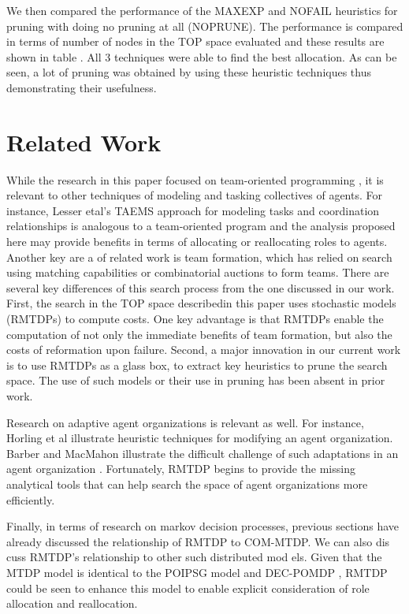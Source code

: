 \documentclass{IEEEtran}
\begin{document}
 We then compared the performance of the MAXEXP and
 NOFAIL heuristics for pruning with doing no pruning at
 all (NOPRUNE). The performance is compared in terms of
 number of nodes in the TOP space evaluated and these results are shown in table . All 3 techniques were able to find
 the best allocation. As can be seen, a lot of pruning was obtained by using these heuristic techniques thus demonstrating their usefulness.

 \section{\textbf{Related Work}}
  While the research in this paper focused on team-oriented
 programming \cite{tambe2000building}, \cite{tidhar1993team} it is relevant to other techniques of modeling and tasking collectives of agents. For instance, Lesser etal's TAEMS
 approach for modeling tasks and coordination relationships
 is analogous to a team-oriented program and the analysis
 proposed here may provide benefits in terms of allocating or
 reallocating roles to agents.
 Another key are a of related work is team formation, which
 has relied on search using matching capabilities \cite{tidhar1996guided} or combinatorial auctions \cite{Hunsberger2000ACA} to form teams. There are several key
 differences of this search process from the one discussed in
 our work. First, the search in the TOP space describedin this
 paper uses stochastic models (RMTDPs) to compute costs.
 One key advantage is that RMTDPs enable the computation
 of not only the immediate benefits of team formation, but
 also the costs of reformation upon failure. Second, a major
 innovation in our current work is to use RMTDPs as a glass
 box, to extract key heuristics to prune the search space. The
 use of such models or their use in pruning has been absent
 in prior work.

 Research on adaptive agent organizations is relevant as
 well. For instance, Horling et al illustrate heuristic techniques for modifying an agent organization. Barber and MacMahon illustrate the difficult challenge of such adaptations in an agent organization \cite{Barber}. Fortunately, RMTDP begins to provide the missing analytical
 tools that can help search the space of agent organizations
 more efficiently.

 Finally, in terms of research on markov decision processes, previous sections have already discussed the relationship of RMTDP to COM-MTDP. We can also dis
cuss RMTDP's relationship to other such distributed mod
els. Given that the MTDP model is identical to the POIPSG
 model \cite{Peshkin} and DEC-POMDP \cite{Bernstein}, RMTDP could be seen to
 enhance this model to enable explicit consideration of role
 allocation and reallocation.
\end{document}
